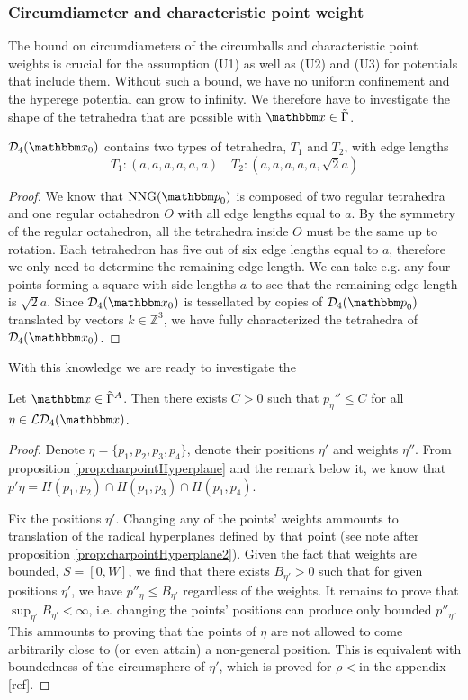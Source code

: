 \begin{remark}
\subsubsection{Circumdiameter and characteristic point weight}
The bound on circumdiameters of the circumballs and characteristic point weights is crucial for the assumption (U1) as well as (U2) and (U3) for potentials that include them. Without such a bound, we have no uniform confinement and the hyperege potential can grow to infinity. We therefore have to investigate the shape of the tetrahedra that are possible with $\x \in \tilde\Gamma$. 

\begin{proposition} $\mathcal D_4(\x_0)$ contains two types of tetrahedra, $T_1$ and $T_2$, with edge lengths
$$T_1: (a,a,a,a,a,a) \quad T_2:(a,a,a,a,a,\sqrt 2a)$$
\end{proposition}
\begin{proof}
We know that $\text{NNG}(\p_0)$ is composed of two regular tetrahedra and one regular octahedron $O$ with all edge lengths equal to $a$. By the symmetry of the regular octahedron, all the tetrahedra inside $O$ must be the same up to rotation. Each tetrahedron has five out of six edge lengths equal to $a$, therefore we only need to determine the remaining edge length. We can take e.g. any four points forming a square with side lengths $a$ to see that the remaining edge length is $\sqrt 2a$.
Since $\mathcal D_4(\x_0)$ is tessellated by copies of $\mathcal D_4(\p_0)$ translated by vectors $k\in\mathbb Z^3$, we have fully characterized the tetrahedra of $\mathcal D_4(\x_0)$. 
\end{proof}

With this knowledge we are ready to investigate the 
\begin{proposition}
Let $\x \in \tilde\Gamma^A$. Then there exists $C>0$ such that $p_\eta'' \leq C$ for all $\eta \in \mathcal {LD}_4(\x)$. 
\end{proposition}
\begin{proof}
Denote $\eta=\{p_1,p_2,p_3,p_4\}$, denote their positions $\eta'$ and weights $\eta''$. From proposition \ref{prop:charpointHyperplane} and the remark below it, we know that $p'\eta = H(p_1,p_2)\cap H(p_1,p_3) \cap H(p_1,p_4)$.

Fix the positions $\eta'$.  Changing any of the points' weights ammounts to translation of the radical hyperplanes defined by that point (see note after proposition \ref{prop:charpointHyperplane2}). Given the fact that weights are bounded, $S=[0,W]$, we find that there exists $B_{\eta'}>0$ such that for given positions $\eta'$, we have $p''_\eta \leq B_{\eta'}$ regardless of the weights.
It remains to prove that $\sup_{\eta'} B_{\eta'} < \infty$, i.e. changing the points' positions can produce only bounded $p''_\eta$. This ammounts to proving that the points of $\eta$ are not allowed to come arbitrarily close to (or even attain) a non-general position. This is equivalent with boundedness of the circumsphere of $\eta'$, which is proved for $\rho<$\tbd in the appendix [ref].
\end{proof}



\end{remark}


